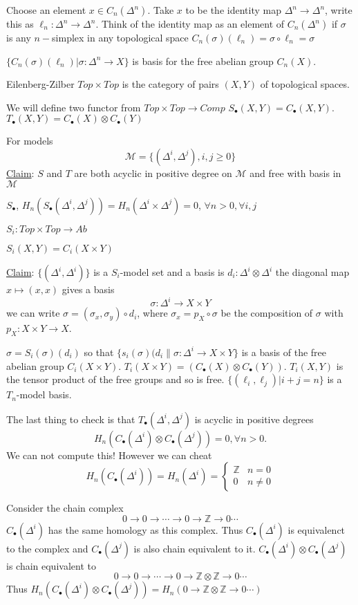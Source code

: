 \documentclass[11pt]{article}
\newcommand{\intg}{\mathbb Z}
\newcommand{\lrta}{\longrightarrow}
\begin{document}
Choose an element $x\in C_n(\Delta^n)$. Take $x$ to be the identity map $\Delta^n\lrta \Delta^n$, write this as $\ell_n:\Delta^n\lrta \Delta^n$. Think of the identity map as an element of $C_n(\Delta^n)$ if $\sigma$ is any $n-$simplex in any topological space
$C_n(\sigma)(\ell_n)=\sigma\circ \ell_n=\sigma$

$\{C_n(\sigma)(\ell_n)|\sigma: \Delta^n\lrta X\}$ is basis for the free abelian group $C_n(X)$.

Eilenberg-Zilber
$Top\times Top$ is the category of pairs $(X,Y)$ of topological spaces.

We will define two functor from $Top\times Top\lrta Comp$
$S_\bullet(X,Y)=C_\bullet(X,Y)$. $T_\bullet (X,Y)=C_\bullet(X)\otimes C_\bullet(Y)$

For models
$$
\mathcal{M}=\{(\Delta^i,\Delta^j), i,j \geq 0\}
$$ 
\underline{Claim}: $S$ and $T$ are both acyclic in positive degree on $\mathcal{M}$ and free with basis in $\mathcal{M}$

$S_\bullet$, $H_n(S_\bullet(\Delta^i, \Delta^j))=H_n(\Delta^i\times \Delta^j)=0$, $\forall n>0, \forall i,j$

$S_i: Top\times Top\lrta Ab$

$S_i(X, Y)=C_i (X\times Y)$

\underline{Claim}: $\{(\Delta^i,\Delta^i)\}$ is a $S_i$-model set and a basis is $d_i:\Delta^i\otimes \Delta^i$ the diagonal map $x\mapsto (x,x)$ gives a basis
$$
\sigma: \Delta^i\lrta X\times Y
$$
we can write 
$\sigma=(\sigma_x,\sigma_y)\circ d_i$,  where $\sigma_x=p_X\circ \sigma$ be the composition of $\sigma$ with $p_X:X\times Y\lrta X$.

$\sigma=S_i(\sigma)(d_i)$ so that
$\{s_i(\sigma )(d_i\|\sigma: \Delta^i\lrta X\times Y\}$ is a basis of the free abelian group $C_i(X\times Y)$. $T_i(X\times Y)=(C_\bullet(X)\otimes C_\bullet(Y))$. $T_i(X, Y)$ is the tensor product of the free groups and so is free.
$\{(\ell_i,\ell_j)|i+j=n\}$ is a $T_n$-model basis.

The last thing to check is that $T_\bullet(\Delta^i, \Delta^j)$ is acyclic in positive degrees
$$
H_n(C_\bullet(\Delta^i)\otimes C_\bullet(\Delta^j))=0,\forall n>0.
$$
We can not compute this! However we can cheat
$$
H_n(C_\bullet(\Delta^i))=H_n(\Delta^i)=\left\{\begin{matrix*}
 \intg & n=0\\
 0 & n\neq 0
\end{matrix*}\right.
$$

Consider the chain complex
$$
0\lrta 0\lrta \cdots\lrta 0\lrta \intg\lrta 0\cdots
$$
$C_\bullet(\Delta^i)$ has the same homology as this complex. Thus $C_\bullet(\Delta^i)$ is equivalenct to the complex and $C_\bullet(\Delta^j)$ is also chain equivalent to it. $C_\bullet(\Delta^i)\otimes C_\bullet(\Delta^j)$ is chain equivalent to 
$$
0\lrta 0\lrta \cdots\lrta 0\lrta \intg\otimes \intg\lrta 0\cdots
$$
Thus $H_n(C_\bullet(\Delta^i)\otimes C_\bullet(\Delta^j))=H_n(0\lrta \intg\otimes \intg\lrta 0\cdots)$
\end{document}
